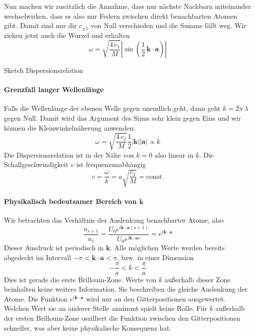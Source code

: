 Nun machen wir zusätzlich die Annahme, dass nur nächste Nachbarn miteinander wechselwirken, dass es also nur Federn zwischen direkt benachbarten Atomen gibt. Damit sind nur dir $c_{\pm 1}$ von Null verschieden und die Summe fällt weg. Wir ziehen jetzt auch die Wurzel und erhalten
\begin{equation}
\omega = \sqrt{\frac{4 \, c_1}{M}} \left| \sin (\frac{1}{2} \, \mathbf{k} \cdot \mathbf{a}  ) \right|
\end{equation}

\begin{marginfigure}
\caption{Sketch Dispersionsrelation}
\end{marginfigure}


\paragraph{Grenzfall langer Wellenlänge} Falls die Wellenlänge der ebenen Welle gegen unendlich geht, dann geht $k = 2 \pi \ \lambda$  gegen Null. Damit wird das Argument des Sinus sehr klein gegen Eins und wir können die Kleinwinkelnäherung anwenden:
\begin{equation}
\omega = \sqrt{\frac{4 \, c_1}{M}} \frac{1}{2}  |\mathbf{k}| | \mathbf{a}| \propto k
\end{equation}
Die Dispersionsrelation ist in der Nähe von $k = 0$ also linear in $k$. Die Schallgeschwindigkeit $v$ ist frequenzunabhängig
\begin{equation}
 v = \frac{\omega}{k} = a  \sqrt{\frac{ c_1}{M}}  = \text{const.}
\end{equation}

\paragraph{Physikalisch bedeutsamer Bereich von $\mathbf{k}$} 
Wir betrachten das Verhältnis der Auslenkung benachbarter Atome, also
\begin{equation}
 \frac{u_{s+1}}{u_s}  = 
 \frac{U_0 e^{i \mathbf{k} \cdot \mathbf{a} (s+1) } } 
        {U_0 e^{i \mathbf{k} \cdot \mathbf{a} s}} 
         = e^{i \mathbf{k} \cdot \mathbf{a}}
\end{equation}
Dieser Ausdruck ist periodisch in $\mathbf{k}$. Alle möglichen Werte werden bereits abgedeckt im Intervall $- \pi < \mathbf{k} \cdot \mathbf{a}  < \pi$, bzw. in einer Dimension 
 \begin{equation}
 - \frac{\pi}{a} < k <  \frac{\pi}{a}
 \end{equation} 
Dies ist gerade die erste Brillouin-Zone. Werte von $k$ außerhalb dieser Zone beinhalten keine weitere Information. Sie beschreiben die gleiche Auslenkung der Atome. Die Funktion  $e^{i \mathbf{k} \cdot \mathbf{a}}$ wird nur an den Gitterpositionen ausgewertet. Welchen Wert sie an anderer Stelle annimmt spielt keine Rolle. Für $k$ außerhalb der ersten Brillouin-Zone oszilliert die Funktion zwischen den Gitterpositionen schneller, was aber keine physikalische Konsequenz hat.

